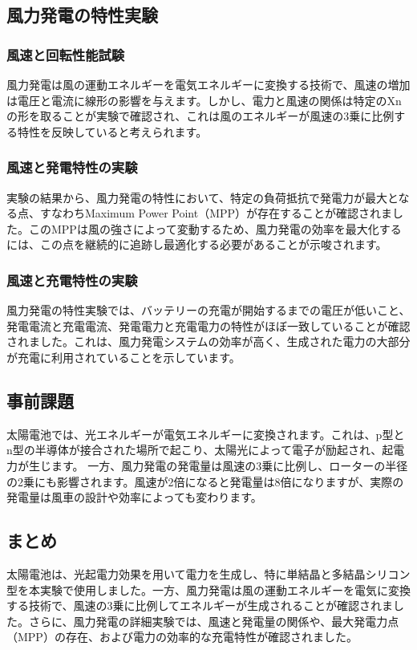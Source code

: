 \documentclass[a4paper,11pt,xelatex,ja=standard]{bxjsarticle}
\begin{document}
    \subsection{風力発電の特性実験}
        \subsubsection{風速と回転性能試験}
            風力発電は風の運動エネルギーを電気エネルギーに変換する技術で、風速の増加は電圧と電流に線形の影響を与えます。しかし、電力と風速の関係は特定のXnの形を取ることが実験で確認され、これは風のエネルギーが風速の3乗に比例する特性を反映していると考えられます。
        \subsubsection{風速と発電特性の実験}
            実験の結果から、風力発電の特性において、特定の負荷抵抗で発電力が最大となる点、すなわちMaximum Power Point（MPP）が存在することが確認されました。このMPPは風の強さによって変動するため、風力発電の効率を最大化するには、この点を継続的に追跡し最適化する必要があることが示唆されます。
        \subsubsection{風速と充電特性の実験}
            風力発電の特性実験では、バッテリーの充電が開始するまでの電圧が低いこと、発電電流と充電電流、発電電力と充電電力の特性がほぼ一致していることが確認されました。これは、風力発電システムの効率が高く、生成された電力の大部分が充電に利用されていることを示しています。


    \subsection{事前課題}
        太陽電池では、光エネルギーが電気エネルギーに変換されます。これは、p型とn型の半導体が接合された場所で起こり、太陽光によって電子が励起され、起電力が生じます。
        一方、風力発電の発電量は風速の3乗に比例し、ローターの半径の2乗にも影響されます。風速が2倍になると発電量は8倍になりますが、実際の発電量は風車の設計や効率によっても変わります。
    \subsection{まとめ}
        太陽電池は、光起電力効果を用いて電力を生成し、特に単結晶と多結晶シリコン型を本実験で使用しました。一方、風力発電は風の運動エネルギーを電気に変換する技術で、風速の3乗に比例してエネルギーが生成されることが確認されました。さらに、風力発電の詳細実験では、風速と発電量の関係や、最大発電力点（MPP）の存在、および電力の効率的な充電特性が確認されました。
\end{document}
